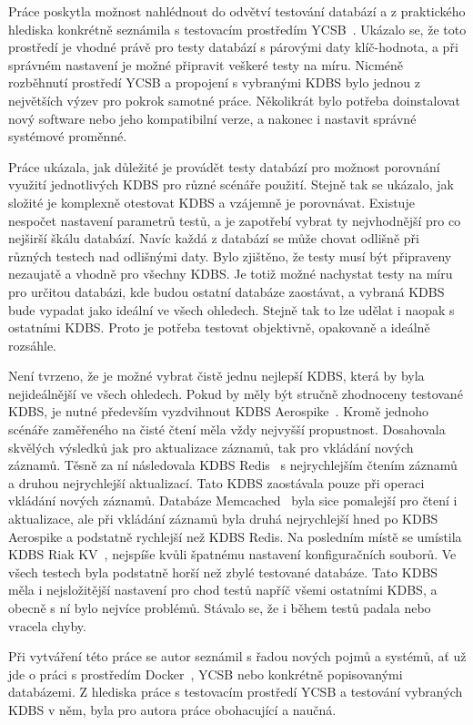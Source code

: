 \documentclass[czech,master,dept460,male,csharp,cpdeclaration]{diploma}
\begin{document}
	Práce poskytla možnost nahlédnout do odvětví testování databází a z praktického hlediska konkrétně seznámila s testovacím prostředím YCSB~\cite{ycsb}. Ukázalo se, že toto prostředí je vhodné právě pro testy databází s párovými daty klíč-hodnota, a při správném nastavení je možné připravit veškeré testy na míru. Nicméně rozběhnutí prostředí YCSB a propojení s vybranými KDBS bylo jednou z největších výzev pro pokrok samotné práce. Několikrát bylo potřeba doinstalovat nový software nebo jeho kompatibilní verze, a nakonec i nastavit správné systémové proměnné.
	
	Práce ukázala, jak důležité je provádět testy databází pro možnost porovnání využití jednotlivých KDBS pro různé scénáře použití. Stejně tak se ukázalo, jak složité je komplexně otestovat KDBS a vzájemně je porovnávat. Existuje nespočet nastavení parametrů testů, a je zapotřebí vybrat ty nejvhodnější pro co nejširší škálu databází. Navíc každá z databází se může chovat odlišně při různých testech nad odlišnými daty. Bylo zjištěno, že testy musí být připraveny nezaujatě a vhodně pro všechny KDBS. Je totiž možné nachystat testy na míru pro určitou databázi, kde budou ostatní databáze zaostávat, a vybraná KDBS bude vypadat jako ideální ve všech ohledech. Stejně tak to lze udělat i naopak s ostatními KDBS. Proto je potřeba testovat objektivně, opakovaně a ideálně rozsáhle.
	
	Není tvrzeno, že je možné vybrat čistě jednu nejlepší KDBS, která by byla nejideálnější ve všech ohledech. Pokud by měly být stručně zhodnoceny testované KDBS, je nutné především vyzdvihnout KDBS Aerospike~\cite{aerospike}. Kromě jednoho scénáře zaměřeného na čisté čtení měla vždy nejvyšší propustnost. Dosahovala skvělých výsledků jak pro aktualizace záznamů, tak pro vkládání nových záznamů. Těsně za ní následovala KDBS Redis~\cite{redis} s nejrychlejším čtením záznamů a druhou nejrychlejší aktualizací. Tato KDBS zaostávala pouze při operaci vkládání nových záznamů. Databáze Memcached~\cite{memcached} byla sice pomalejší pro čtení i aktualizace, ale při vkládání záznamů byla druhá nejrychlejší hned po KDBS Aerospike a podstatně rychlejší než KDBS Redis. Na posledním místě se umístila KDBS Riak KV~\cite{riak}, nejspíše kvůli špatnému nastavení konfiguračních souborů. Ve všech testech byla podstatně horší než zbylé testované databáze. Tato KDBS měla i nejsložitější nastavení pro chod testů napříč všemi ostatními KDBS, a obecně s ní bylo nejvíce problémů. Stávalo se, že i během testů padala nebo vracela chyby.
	
	Při vytváření této práce se autor seznámil s řadou nových pojmů a systémů, ať už jde o práci s prostředím Docker~\cite{docker}, YCSB nebo konkrétně popisovanými databázemi. Z hlediska práce s testovacím prostředí YCSB a testování vybraných KDBS v něm, byla pro autora práce obohacující a naučná.
	
	\nocite{*}
	
	\printbibliography[title={Literatura}, heading=bibintoc]
	
\end{document}
